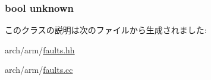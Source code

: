 \label{classArmISA_1_1UndefinedInstruction_af5e67d95019a0b5aba4c42205567eda7}
\hypertarget{classArmISA_1_1UndefinedInstruction_ac160cc61da581bdcf075273493b9f156}{
\subsubsection[{unknown}]{\setlength{\rightskip}{0pt plus 5cm}bool {\bf unknown}}}
\label{classArmISA_1_1UndefinedInstruction_ac160cc61da581bdcf075273493b9f156}


このクラスの説明は次のファイルから生成されました:\begin{DoxyCompactItemize}
\item 
arch/arm/\hyperlink{arch_2arm_2faults_8hh}{faults.hh}\item 
arch/arm/\hyperlink{arch_2arm_2faults_8cc}{faults.cc}\end{DoxyCompactItemize}

